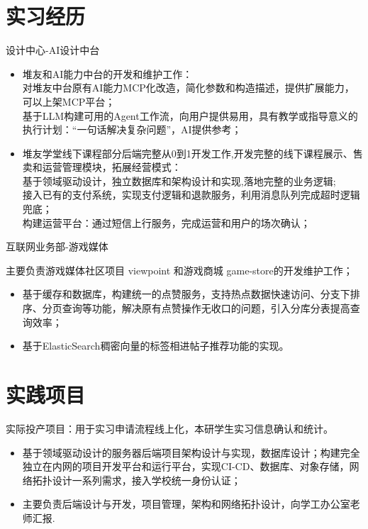 \documentclass{resume}
\begin{document}
\section{实习经历}
\Content
{{设计中心-AI设计中台}}
{
    \begin{itemize}
        \item 堆友和AI能力中台的开发和维护工作：\\ 对堆友中台原有AI能力MCP化改造，简化参数和构造描述，提供扩展能力，可以上架MCP平台；\\ 基于LLM构建可用的Agent工作流，向用户提供易用，具有教学或指导意义的执行计划：“一句话解决复杂问题”，AI提供参考；
        \item 堆友学堂线下课程部分后端完整从0到1开发工作,开发完整的线下课程展示、售卖和运营管理模块，拓展经营模式：\\
        基于领域驱动设计，独立数据库和架构设计和实现,落地完整的业务逻辑;\\
        接入已有的支付系统，实现支付逻辑和退款服务，利用消息队列完成超时逻辑兜底；\\
        构建运营平台：通过短信上行服务，完成运营和用户的场次确认；
    \end{itemize}
}
\Content
{{互联网业务部-游戏媒体}}
{
    主要负责游戏媒体社区项目 viewpoint 和游戏商城 game-store的开发维护工作；
    \begin{itemize}
        \item 基于缓存和数据库，构建统一的点赞服务，支持热点数据快速访问、分支下排序、分页查询等功能，解决原有点赞操作无收口的问题，引入分库分表提高查询效率；
        \item 基于ElasticSearch稠密向量的标签相进帖子推荐功能的实现。
    \end{itemize}
}

\section{实践项目}
\Contents
{实际投产项目：用于实习申请流程线上化，本研学生实习信息确认和统计。}
{\begin{itemize}
    \item 基于领域驱动设计的服务器后端项目架构设计与实现，数据库设计；构建完全独立在内网的项目开发平台和运行平台，实现CI-CD、数据库、对象存储，网络拓扑设计一系列需求，接入学校统一身份认证；
    \item 主要负责后端设计与开发，项目管理，架构和网络拓扑设计，向学工办公室老师汇报.
\end{itemize}
}
\end{document}
